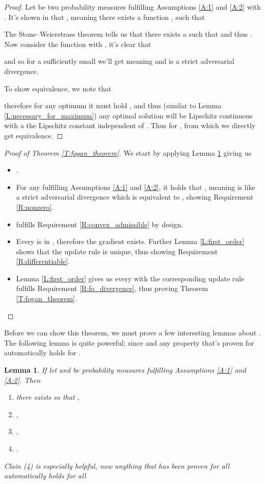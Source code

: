 \documentclass{article}
\newtheorem{lemma}{Lemma}
\begin{document}
 \begin{proof}
  Let  be two probability measures fulfilling Assumptions \ref{A:1} and \ref{A:2} with .
  It's shown in \cite{sriperumbudur2010hilbert} that ,
  meaning there exists a function ,  such that
 
 The Stone–Weierstrass theorem tells us that there exists a  such that 
 and thus .
 Now consider the function  with , it's clear that
 
 and so for a sufficiently small  we'll get 
 meaning  and  is a strict adversarial divergence.

 To show equivalence, we note that
 
 therefore for any optimum it must hold , and thus (similar to Lemma \ref{L:necessary_for_maximum}) any optimal solution will
 be Lipschitz continuous with a the Lipschitz constant independent of . Thus  for
 , from which we directly get equivalence.
 \end{proof}

 \begin{proof}[Proof of Theorem \ref{T:fogan_theorem}]
 We start by applying Lemma \ref{L:adversary_subset} giving us
 \begin{itemize}
  \item .
  \item For any  fulfilling Assumptions \ref{A:1} and \ref{A:2}, it holds that
  , meaning  is like  a strict adversarial divergence
  which is equivalent to , showing Requirement \ref{R:nonzero}.
  \item  fulfills Requirement \ref{R:convex_admissible} by design.
  \item Every  is in ,
  therefore  the gradient  exists. Further Lemma \ref{L:first_order}
  shows that the update rule  is unique, thus showing Requirement \ref{R:differentiable}.
  \item Lemma \ref{L:first_order} gives us
 every  with the corresponding update rule fulfills Requirement \ref{R:fo_divergence}, thus proving Theorem \ref{T:fogan_theorem}.
 \end{itemize}
 \end{proof}

 Before we can show this theorem, we must prove a few interesting lemmas about . The following lemma is quite powerful;
 since  and 
 any property that's proven for  automatically holds for .

 \begin{lemma}\label{L:adversary_subset}
If let  and  be probability measures fulfilling Assumptions \ref{A:1} and \ref{A:2}. Then
\begin{enumerate}
 \item there exists  so that ,
 \item ,
 \item ,
 \item .
\end{enumerate}
Clain (4) is especially helpful, now anything that has been proven for all 
automatically holds for all 
\end{lemma}
\end{document}
